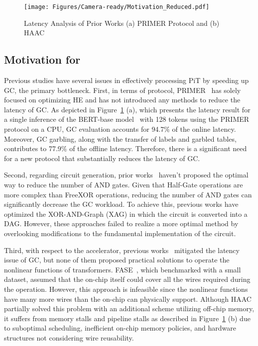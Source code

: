 \begin{figure}[t]
    \vspace{-0.2in}
    \centering
    \texttt{[image: Figures/Camera-ready/Motivation\_Reduced.pdf]}
    \caption{Latency Analysis of Prior Works (a) PRIMER Protocol and (b) HAAC}
    \vspace{-0.2in}
    \label{fig:APINT_motivation}
\end{figure}
    
\subsection{Motivation for \sysname}

Previous studies have several issues in effectively processing PiT by speeding up GC, the primary bottleneck.
First, in terms of protocol, PRIMER~\cite{zheng2023primer} has solely focused on optimizing HE and has not introduced any methods to reduce the latency of GC. As depicted in Figure~\ref{fig:APINT_motivation} (a), which presents the latency result for a single inference of the BERT-base model~\cite{devlin2018bert} with 128 tokens using the PRIMER protocol on a CPU, GC evaluation accounts for 94.7\% of the online latency. Moreover, GC garbling, along with the transfer of labels and garbled tables, contributes to 77.9\% of the offline latency. Therefore, there is a significant need for a new protocol that substantially reduces the latency of GC.

Second, regarding circuit generation, prior works~\cite{testa2019reducing, testa2020logic, liu2022don} haven't proposed the optimal way to reduce the number of AND gates. Given that Half-Gate operations are more complex than FreeXOR operations, reducing the number of AND gates can significantly decrease the GC workload. To achieve this, previous works have optimized the XOR-AND-Graph (XAG) in which the circuit is converted into a DAG. However, these approaches failed to realize a more optimal method by overlooking modifications to the fundamental implementation of the circuit.

Third, with respect to the accelerator, previous works~\cite{hussain2019fase, mo2023haac} mitigated the latency issue of GC, but none of them proposed practical solutions to operate the nonlinear functions of transformers. FASE~\cite{hussain2019fase}, which benchmarked with a small dataset, assumed that the on-chip itself could cover all the wires required during the operation.
However, this approach is infeasible since the nonlinear functions have many more wires than the on-chip can physically support. Although HAAC~\cite{mo2023haac} partially solved this problem with an additional scheme utilizing off-chip memory, it suffers from memory stalls and pipeline stalls as described in Figure~\ref{fig:APINT_motivation} (b) due to suboptimal scheduling, inefficient on-chip memory policies, and hardware structures not considering wire reusability.

